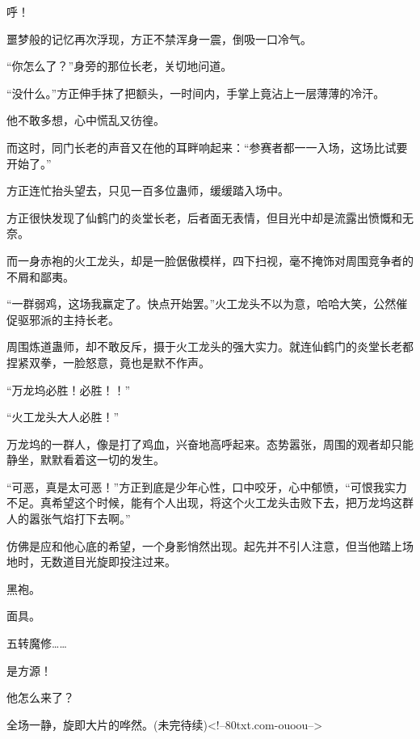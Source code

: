 \begin{this_body}
呼！

噩梦般的记忆再次浮现，方正不禁浑身一震，倒吸一口冷气。

“你怎么了？”身旁的那位长老，关切地问道。

“没什么。”方正伸手抹了把额头，一时间内，手掌上竟沾上一层薄薄的冷汗。

他不敢多想，心中慌乱又彷徨。

而这时，同门长老的声音又在他的耳畔响起来：“参赛者都一一入场，这场比试要开始了。”

方正连忙抬头望去，只见一百多位蛊师，缓缓踏入场中。

方正很快发现了仙鹤门的炎堂长老，后者面无表情，但目光中却是流露出愤慨和无奈。

而一身赤袍的火工龙头，却是一脸倨傲模样，四下扫视，毫不掩饰对周围竞争者的不屑和鄙夷。

“一群弱鸡，这场我赢定了。快点开始罢。”火工龙头不以为意，哈哈大笑，公然催促驱邪派的主持长老。

周围炼道蛊师，却不敢反斥，摄于火工龙头的强大实力。就连仙鹤门的炎堂长老都捏紧双拳，一脸怒意，竟也是默不作声。

“万龙坞必胜！必胜！！”

“火工龙头大人必胜！”

万龙坞的一群人，像是打了鸡血，兴奋地高呼起来。态势嚣张，周围的观者却只能静坐，默默看着这一切的发生。

“可恶，真是太可恶！”方正到底是少年心性，口中咬牙，心中郁愤，“可恨我实力不足。真希望这个时候，能有个人出现，将这个火工龙头击败下去，把万龙坞这群人的嚣张气焰打下去啊。”

仿佛是应和他心底的希望，一个身影悄然出现。起先并不引人注意，但当他踏上场地时，无数道目光旋即投注过来。

黑袍。

面具。

五转魔修……

是方源！

他怎么来了？

全场一静，旋即大片的哗然。(未完待续)<!--80txt.com-ouoou-->

\end{this_body}

